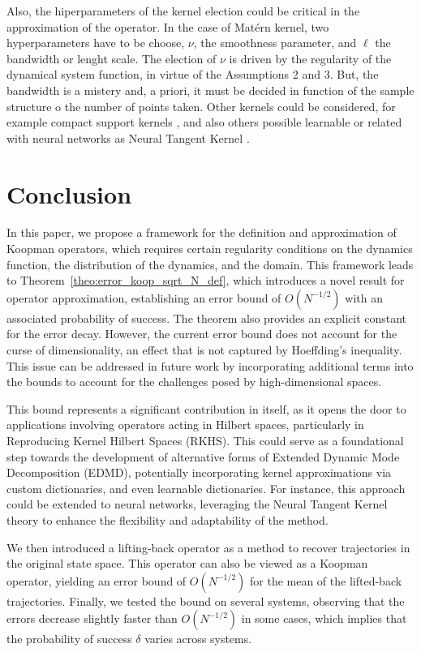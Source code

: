 \documentclass{article}
\begin{document}
Also, the hiperparameters of the kernel election could be critical in the approximation of the operator. In the case of Matérn kernel, two hyperparameters have to be choose, $\nu$, the smoothness parameter, and $\ell$ the bandwidth or lenght scale. The election of $\nu$ is driven by the regularity of the dynamical system function, in virtue of the Assumptions 2 and 3. But, the bandwidth is a mistery and, a priori, it must be decided in function of the sample structure o the number of points taken. Other kernels could be considered, for example compact support kernels \cite{Wendland1995PiecewiseDegree, Kohne2025boldsymbolLboldsymbolinftyDecomposition}, and also others possible learnable or related with neural networks as Neural Tangent Kernel \cite{Jacot2018NeuralNetworks}.

\section{Conclusion}
In this paper, we propose a framework for the definition and approximation of Koopman operators, which requires certain regularity conditions on the dynamics function, the distribution of the dynamics, and the domain. This framework leads to Theorem~\ref{theo:error_koop_sqrt_N_def}, which introduces a novel result for operator approximation, establishing an error bound of $O(N^{-1/2})$ with an associated probability of success. The theorem also provides an explicit constant for the error decay. However, the current error bound does not account for the curse of dimensionality, an effect that is not captured by Hoeffding’s inequality. This issue can be addressed in future work by incorporating additional terms into the bounds to account for the challenges posed by high-dimensional spaces.

This bound represents a significant contribution in itself, as it opens the door to applications involving operators acting in Hilbert spaces, particularly in Reproducing Kernel Hilbert Spaces (RKHS). This could serve as a foundational step towards the development of alternative forms of Extended Dynamic Mode Decomposition (EDMD), potentially incorporating kernel approximations via custom dictionaries, and even learnable dictionaries. For instance, this approach could be extended to neural networks, leveraging the Neural Tangent Kernel theory \cite{Jacot2018NeuralNetworks} to enhance the flexibility and adaptability of the method.

We then introduced a lifting-back operator as a method to recover trajectories in the original state space. This operator can also be viewed as a Koopman operator, yielding an error bound of $O(N^{-1/2})$ for the mean of the lifted-back trajectories. Finally, we tested the bound on several systems, observing that the errors decrease slightly faster than $O(N^{-1/2})$ in some cases, which implies that the probability of success $\delta$ varies across systems.
\end{document}

